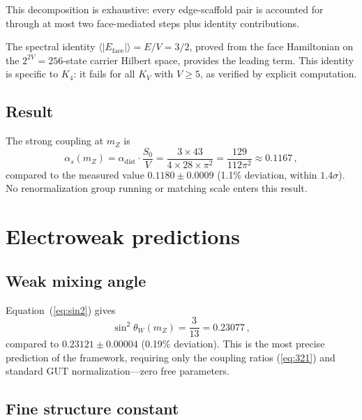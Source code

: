 \documentclass[aip,graphicx]{revtex4-1}
\begin{document}
This decomposition is exhaustive: every edge-scaffold pair is
accounted for through at most two face-mediated steps plus identity
contributions.

The spectral identity $\langle |E_{\mathrm{face}}| \rangle = E/V =
3/2$, proved from the face Hamiltonian on the $2^{2V} = 256$-state
carrier Hilbert space, provides the leading term. This identity is
specific to $K_4$: it fails for all $K_V$ with $V \geq 5$, as
verified by explicit computation.

\subsection{Result}

The strong coupling at $m_Z$ is
\begin{equation}
\boxed{\alpha_s(m_Z) = \alpha_{\mathrm{dist}} \cdot \frac{S_0}{V}
= \frac{3 \times 43}{4 \times 28 \times \pi^2}
= \frac{129}{112\pi^2}
\approx 0.1167} \,,
\label{eq:alphas}
\end{equation}
compared to the measured value $0.1180 \pm 0.0009$\cite{pdg2024}
(1.1\% deviation, within $1.4\sigma$). No renormalization group
running or matching scale enters this result.


\section{Electroweak predictions}
\label{sec:ew}

\subsection{Weak mixing angle}

Equation~(\ref{eq:sin2}) gives
\begin{equation}
\boxed{\sin^2\theta_W(m_Z) = \frac{3}{13} = 0.23077} \,,
\label{eq:weinberg}
\end{equation}
compared to $0.23121 \pm 0.00004$\cite{pdg2024} (0.19\% deviation).
This is the most precise prediction of the framework, requiring
only the coupling ratios (\ref{eq:321}) and standard GUT
normalization---zero free parameters.

\subsection{Fine structure constant}
\end{document}
